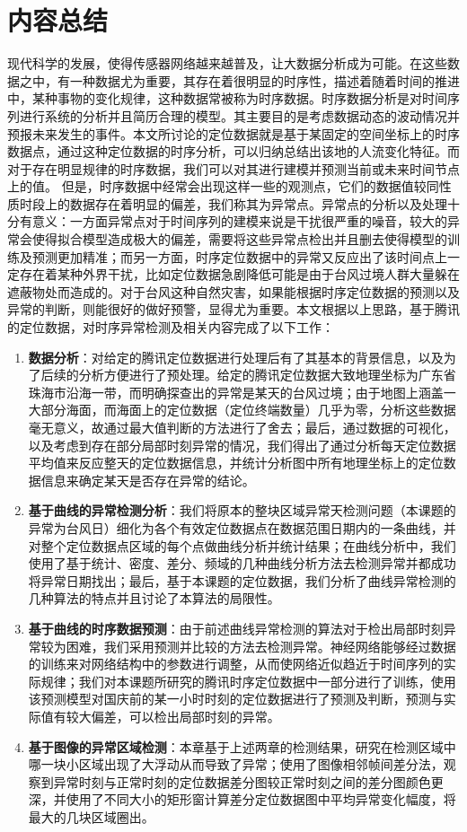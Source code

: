 \documentclass[a4paper,AutoFakeBold,oneside,12pt]{book}
\begin{document}
{{\section{内容总结}
	现代科学的发展，使得传感器网络越来越普及，让大数据分析成为可能。在这些数据之中，有一种数据尤为重要，其存在着很明显的时序性，描述着随着时间的推进中，某种事物的变化规律，这种数据常被称为时序数据。时序数据分析是对时间序列进行系统的分析并且简历合理的模型。其主要目的是考虑数据动态的波动情况并预报未来发生的事件。本文所讨论的定位数据就是基于某固定的空间坐标上的时序数据点，通过这种定位数据的时序分析，可以归纳总结出该地的人流变化特征。而对于存在明显规律的时序数据，我们可以对其进行建模并预测当前或未来时间节点上的值。
	但是，时序数据中经常会出现这样一些的观测点，它们的数据值较同性质时段上的数据存在着明显的偏差，我们称其为异常点。异常点的分析以及处理十分有意义：一方面异常点对于时间序列的建模来说是干扰很严重的噪音，较大的异常会使得拟合模型造成极大的偏差，需要将这些异常点检出并且删去使得模型的训练及预测更加精准；而另一方面，时序定位数据中的异常又反应出了该时间点上一定存在着某种外界干扰，比如定位数据急剧降低可能是由于台风过境人群大量躲在遮蔽物处而造成的。对于台风这种自然灾害，如果能根据时序定位数据的预测以及异常的判断，则能很好的做好预警，显得尤为重要。本文根据以上思路，基于腾讯的定位数据，对时序异常检测及相关内容完成了以下工作：
\begin{enumerate}
\item \textbf{数据分析}：对给定的腾讯定位数据进行处理后有了其基本的背景信息，以及为了后续的分析方便进行了预处理。给定的腾讯定位数据大致地理坐标为广东省珠海市沿海一带，而明确探查出的异常是某天的台风过境；由于地图上涵盖一大部分海面，而海面上的定位数据（定位终端数量）几乎为零，分析这些数据毫无意义，故通过最大值判断的方法进行了舍去；最后，通过数据的可视化，以及考虑到存在部分局部时刻异常的情况，我们得出了通过分析每天定位数据平均值来反应整天的定位数据信息，并统计分析图中所有地理坐标上的定位数据信息来确定某天是否存在异常的结论。
\item \textbf{基于曲线的异常检测分析}：我们将原本的整块区域异常天检测问题（本课题的异常为台风日）细化为各个有效定位数据点在数据范围日期内的一条曲线，并对整个定位数据点区域的每个点做曲线分析并统计结果；在曲线分析中，我们使用了基于统计、密度、差分、频域的几种曲线分析方法去检测异常并都成功将异常日期找出；最后，基于本课题的定位数据，我们分析了曲线异常检测的几种算法的特点并且讨论了本算法的局限性。
\item \textbf{基于曲线的时序数据预测}：由于前述曲线异常检测的算法对于检出局部时刻异常较为困难，我们采用预测并比较的方法去检测异常。神经网络能够经过数据的训练来对网络结构中的参数进行调整，从而使网络近似趋近于时间序列的实际规律；我们对本课题所研究的腾讯时序定位数据中一部分进行了训练，使用该预测模型对国庆前的某一小时时刻的定位数据进行了预测及判断，预测与实际值有较大偏差，可以检出局部时刻的异常。
\item \textbf{基于图像的异常区域检测}：本章基于上述两章的检测结果，研究在检测区域中哪一块小区域出现了大浮动从而导致了异常；使用了图像相邻帧间差分法，观察到异常时刻与正常时刻的定位数据差分图较正常时刻之间的差分图颜色更深，并使用了不同大小的矩形窗计算差分定位数据图中平均异常变化幅度，将最大的几块区域圈出。
\end{enumerate}

}}
\end{document}
